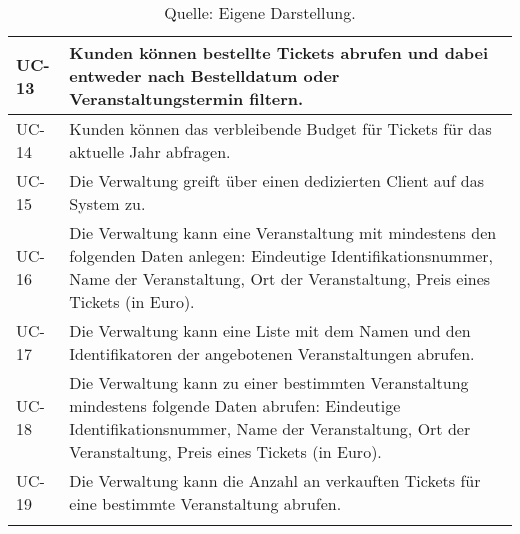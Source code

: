 \begin{longtable}{lp{}}
\midrule
UC-13 & Kunden können bestellte Tickets abrufen und dabei entweder nach Bestelldatum oder Veranstaltungstermin filtern.\\
\midrule
UC-14 & Kunden können das verbleibende Budget für Tickets für das aktuelle Jahr abfragen.\\
\midrule
UC-15 & Die Verwaltung greift über einen dedizierten Client auf das System zu.\\
\midrule
UC-16 & Die Verwaltung kann eine Veranstaltung mit mindestens den folgenden Daten anlegen: Eindeutige Identifikationsnummer, Name der Veranstaltung, Ort der Veranstaltung, Preis eines Tickets (in Euro).\\
\midrule
UC-17 & Die Verwaltung kann eine Liste mit dem Namen und den Identifikatoren der angebotenen Veranstaltungen abrufen.\\
\midrule
UC-18 & Die Verwaltung kann zu einer bestimmten Veranstaltung mindestens folgende Daten abrufen: Eindeutige Identifikationsnummer, Name der Veranstaltung, Ort der Veranstaltung, Preis eines Tickets (in Euro).\\
\midrule
UC-19 & Die Verwaltung kann die Anzahl an verkauften Tickets für eine bestimmte Veranstaltung abrufen.\\
\bottomrule
\caption*{\footnotesize{Quelle: Eigene Darstellung.}}
\end{longtable}
\endgroup
